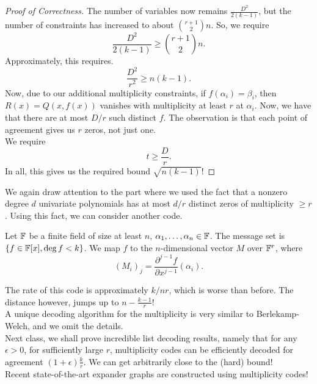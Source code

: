 			\begin{proof}[Proof of Correctness]
				The number of variables now remains $\frac{D^2}{2(k-1)}$, but the number of constraints has increased to about $\binom{r+1}{2}n$. So, we require
				\[ \frac{D^2}{2(k-1)} \ge \binom{r+1}{2} n. \]
				Approximately, this requires.
				\[ \frac{D^2}{r^2} \ge n(k-1). \]
				Now, due to our additional multiplicity constraints, if $f(\alpha_i) = \beta_i$, then $R(x) = Q(x,f(x))$ vanishes with multiplicity at least $r$ at $\alpha_i$. %
				Now, we have that there are at most $D/r$ such distinct $f$. The observation is that each point of agreement gives us $r$ zeros, not just one.\\
				We require
				\[ t \ge \frac{D}{r}. \]
				In all, this gives us the required bound $\sqrt{n(k-1)}$!
			\end{proof}


			We again draw attention to the part where we used the fact that a nonzero degree $d$ univariate polynomials has at most $d/r$ distinct zeros of multiplicity $\ge r$.
			Using this fact, we can consider another code.

			\begin{fdef}
				Let $\mathbb{F}$ be a finite field of size at least $n$, $\alpha_1,\ldots,\alpha_n \in \mathbb{F}$. The message set is $\{f \in \mathbb{F}[x], \deg f < k\}$. We map $f$ to the $n$-dimensional vector $M$ over $\mathbb{F}^r$, where
				\[ (M_{i})_j = \frac{\partial^{j-1} f}{\partial x^{j-1}}(\alpha_i). \]
			\end{fdef}

			The rate of this code is approximately $k/nr$, which is worse than before. The distance however, jumps up to $n - \frac{k-1}{r}$!\\
			A unique decoding algorithm for the multiplicity is very similar to Berlekamp-Welch, and we omit the details.\\
			Next class, we shall prove incredible list decoding results, namely that for any $\epsilon > 0$, for sufficiently large $r$, multiplicity codes can be efficiently decoded for agreement $(1+\epsilon)\frac{k}{r}$. We can get arbitrarily close to the (hard) bound!\\ %
			Recent state-of-the-art expander graphs are constructed using multiplicity codes! %